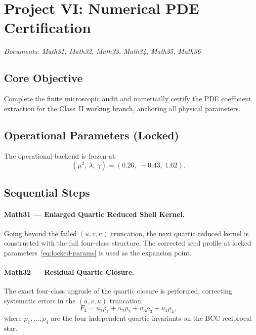 \documentclass[reprint,aps,pre,onecolumn,superscriptaddress,amsmath,amssymb]{revtex4-2}
\begin{document}
\section{Project VI: Numerical PDE Certification}
\label{sec:proj6}
\textit{Documents: Math31, Math32, Math33, Math34, Math35, Math36}

\subsection{Core Objective}

Complete the finite microscopic audit and numerically certify the PDE
coefficient extraction for the Class~II working branch, anchoring all
physical parameters.

\subsection{Operational Parameters (Locked)}

The operational backend is frozen at:
\begin{equation}
  \boxed{
    (\mu^{2},\,\lambda,\,\gamma) = (0.26,\;-0.43,\;1.62).
  }
  \label{eq:locked-params}
\end{equation}

\subsection{Sequential Steps}

\paragraph{Math31 --- Enlarged Quartic Reduced Shell Kernel.}
Going beyond the failed $(u,v,\kappa)$ truncation, the next quartic reduced
kernel is constructed with the full four-class structure. The corrected seed profile
at locked parameters~\eqref{eq:locked-params} is used as the expansion point.

\paragraph{Math32 --- Residual Quartic Closure.}
The exact four-class upgrade of the quartic closure is performed, correcting
systematic errors in the $(u,v,\kappa)$ truncation:
\begin{equation}
  F_{4} = u_{1}\rho_{1} + u_{2}\rho_{2} + u_{3}\rho_{3} + u_{4}\rho_{4},
  \label{eq:quartic-closure}
\end{equation}
where $\rho_{1},\ldots,\rho_{4}$ are the four independent quartic invariants
on the BCC reciprocal star.
\end{document}
